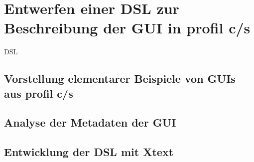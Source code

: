 \chapter{Entwerfen einer DSL zur Beschreibung der GUI in profil c/s}
\gls{DSL}
\section{Vorstellung elementarer Beispiele von GUIs aus profil c/s}
\section{Analyse der Metadaten der GUI}
\section{Entwicklung der DSL mit Xtext}
